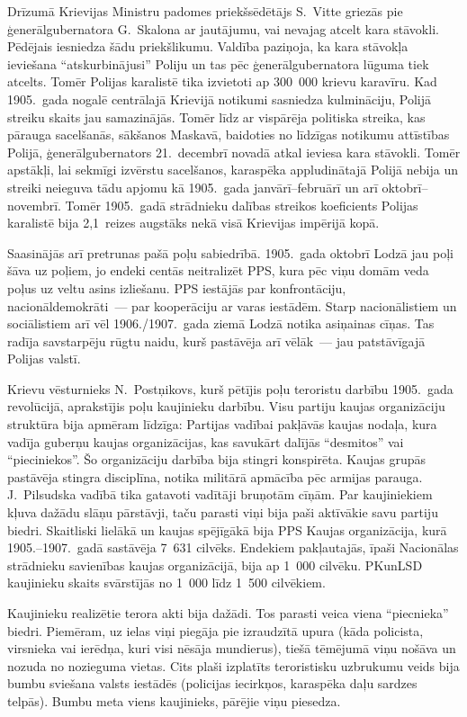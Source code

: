 \documentclass[twoside,a5paper,12pt,fleqn,openany]{extbook}
\begin{document}
Drīzumā Krievijas Ministru padomes priekšsēdētājs S.~Vitte griezās pie ģenerālgubernatora G.~Skalona ar jautājumu, vai nevajag atcelt kara stāvokli. Pēdējais iesniedza šādu priekšlikumu. Valdība paziņoja, ka kara stāvokļa ieviešana ``atskurbinājusi'' Poliju un tas pēc ģenerālgubernatora lūguma tiek atcelts. Tomēr Polijas karalistē tika izvietoti ap 300~000 krievu karavīru. Kad 1905.~gada nogalē centrālajā Krievijā notikumi sasniedza kulmināciju, Polijā streiku skaits jau samazinājās. Tomēr līdz ar vispārēja politiska streika, kas pārauga sacelšanās, sākšanos Maskavā, baidoties no līdzīgas notikumu attīstības Polijā, ģenerālgubernators 21.~decembrī novadā atkal ieviesa kara stāvokli. Tomēr apstākļi, lai sekmīgi izvērstu sacelšanos, karaspēka appludinātajā Polijā nebija un streiki neieguva tādu apjomu kā 1905.~gada janvārī--februārī un arī oktobrī--novembrī. Tomēr 1905.~gadā strādnieku dalības streikos koeficients Polijas karalistē bija 2,1~reizes augstāks nekā visā Krievijas impērijā kopā.

Saasinājās arī pretrunas pašā poļu sabiedrībā. 1905.~gada oktobrī Lodzā jau poļi šāva uz poļiem, jo endeki centās neitralizēt PPS, kura pēc viņu domām veda poļus uz veltu asins izliešanu. PPS iestājās par konfrontāciju, nacionāldemokrāti~--- par kooperāciju ar varas iestādēm. Starp nacionālistiem un sociālistiem arī vēl 1906./1907.~gada ziemā Lodzā notika asiņainas cīņas. Tas radīja savstarpēju rūgtu naidu, kurš pastāvēja arī vēlāk~--- jau patstāvīgajā Polijas valstī.

Krievu vēsturnieks N.~Postņikovs, kurš pētījis poļu teroristu darbību 1905.~gada revolūcijā, aprakstījis poļu kaujinieku darbību. Visu partiju kaujas organizāciju struktūra bija apmēram līdzīga: Partijas vadībai pakļāvās kaujas nodaļa, kura vadīja guberņu kaujas organizācijas, kas savukārt dalījās ``desmitos'' vai ``pieciniekos''. Šo organizāciju darbība bija stingri konspirēta. Kaujas grupās pastāvēja stingra disciplīna, notika militārā apmācība pēc armijas parauga. J.~Pilsudska vadībā tika gatavoti vadītāji bruņotām cīņām. Par kaujiniekiem kļuva dažādu slāņu pārstāvji, taču parasti viņi bija paši aktīvākie savu partiju biedri. Skaitliski lielākā un kaujas spējīgākā bija PPS Kaujas organizācija, kurā 1905.--1907.~gadā sastāvēja 7~631 cilvēks. Endekiem pakļautajās, īpaši Nacionālas strādnieku savienības kaujas organizācijā, bija ap 1~000 cilvēku. PKunLSD kaujinieku skaits svārstījās no 1~000 līdz 1~500 cilvēkiem.

Kaujinieku realizētie terora akti bija dažādi. Tos parasti veica viena ``piecnieka'' biedri. Piemēram, uz ielas viņi piegāja pie izraudzītā upura (kāda policista, virsnieka vai ierēdņa, kuri visi nēsāja mundierus), tiešā tēmējumā viņu nošāva un nozuda no nozieguma vietas. Cits plaši izplatīts teroristisku uzbrukumu veids bija bumbu sviešana valsts iestādēs (policijas iecirkņos, karaspēka daļu sardzes telpās). Bumbu meta viens kaujinieks, pārējie viņu piesedza.
\end{document}
